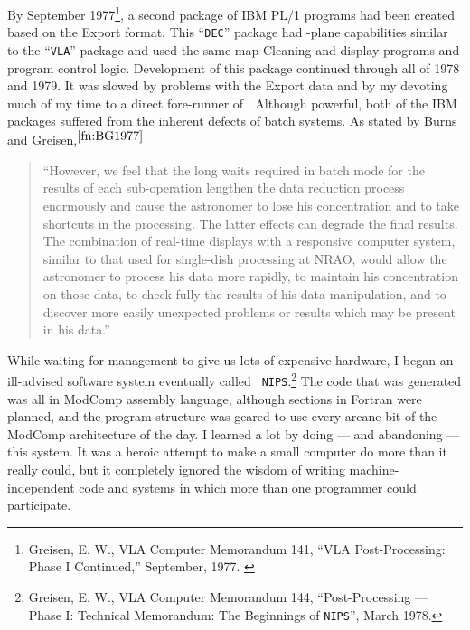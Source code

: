 By September 1977\footnote{Greisen, E. W., VLA Computer Memorandum
141, ``VLA Post-Processing: Phase I Continued,'' September, 1977.
\label{fn:G1977}}, a second package of IBM PL/1 programs had been
created based on the Export format.  This ``{\tt DEC}'' package had
\uv-plane capabilities similar to the ``{\tt VLA}'' package and used
the same map Cleaning and display programs and program control logic.
Development of this package continued through all of 1978 and 1979.
It was slowed by problems with the Export data and by my devoting much
of my time to a direct fore-runner of \hbox{\AIPS}.  Although
powerful, both of the IBM packages suffered from the inherent defects
of batch systems.  As stated by Burns and Greisen,$^{\ref{fn:BG1977}}$
\vspace{-5pt}
\begin{quotation}
``However, we feel that the long waits required in batch mode for the
results of each sub-operation lengthen the data reduction process
enormously and cause the astronomer to lose his concentration and to
take shortcuts in the processing.  The latter effects can degrade the
final results.  The combination of real-time displays with a
responsive computer system, similar to that used for single-dish
processing at NRAO, would allow the astronomer to process his data
more rapidly, to maintain his concentration on those data, to check
fully the results of his data manipulation, and to discover more
easily unexpected problems or results which may be present in his
data.''
\end{quotation}
While waiting for management to give us lots of expensive hardware, I
began an ill-advised software system eventually called \hbox{{\tt
NIPS}}.\footnote{Greisen, E. W., VLA Computer Memorandum
144, ``Post-Processing --- Phase I: Technical Memorandum: The
Beginnings of {\tt NIPS}'', March 1978.\label{fn:G1978}}  The code
that was generated was all in ModComp assembly language, although
sections in Fortran were planned, and the program structure was geared
to use every arcane bit of the ModComp architecture of the day.  I
learned a lot by doing --- and abandoning --- this system.  It was a
heroic attempt to make a small computer do more than it really could,
but it completely ignored the wisdom of writing machine-independent
code and systems in which more than one programmer could participate.

